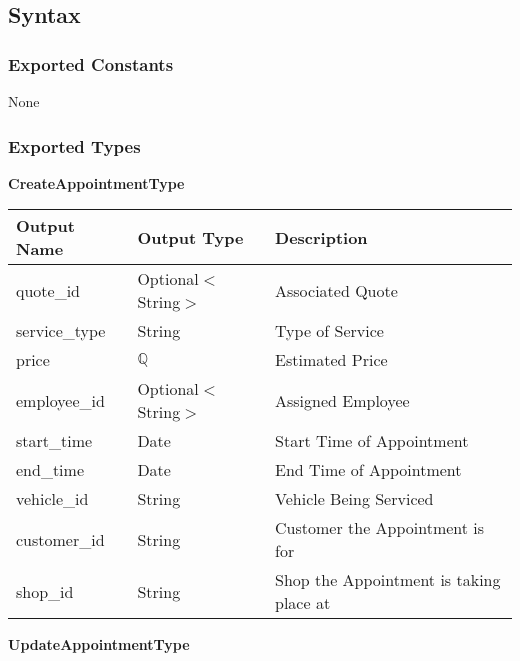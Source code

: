 \documentclass[12pt, titlepage]{article}
\begin{document}
\subsection{Syntax}

\subsubsection{Exported Constants}

None

\subsubsection{Exported Types}

\textbf{CreateAppointmentType}

\begin{table}[H]
	\begin{tabular}{|l|l|l|}
		\hline
		\textbf{Output Name} & \textbf{Output Type} & \textbf{Description}                    \\
		\hline
		quote\_id            & Optional$<$String$>$ & Associated Quote                        \\
		\hline
		service\_type        & String               & Type of Service                         \\
		\hline
		price                & $\mathbb{Q}$         & Estimated Price                         \\
		\hline
		employee\_id         & Optional$<$String$>$ & Assigned Employee                       \\
		\hline
		start\_time          & Date                 & Start Time of Appointment               \\
		\hline
		end\_time            & Date                 & End Time of Appointment                 \\
		\hline
		vehicle\_id          & String               & Vehicle Being Serviced                  \\
		\hline
		customer\_id         & String               & Customer the Appointment is for         \\
		\hline
		shop\_id             & String               & Shop the Appointment is taking place at \\
		\hline
	\end{tabular}
\end{table}

\textbf{UpdateAppointmentType}
\end{document}

